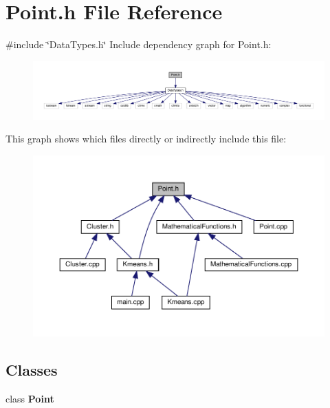 \section{Point.\+h File Reference}
\label{_point_8h}
{\ttfamily \#include \char`\"{}Data\+Types.\+h\char`\"{}}\newline
Include dependency graph for Point.\+h\+:\nopagebreak
\begin{figure}[H]
\begin{center}
\leavevmode
\includegraphics[width=350pt]{_point_8h__incl}
\end{center}
\end{figure}
This graph shows which files directly or indirectly include this file\+:\nopagebreak
\begin{figure}[H]
\begin{center}
\leavevmode
\includegraphics[width=350pt]{_point_8h__dep__incl}
\end{center}
\end{figure}
\subsection*{Classes}
\begin{DoxyCompactItemize}
\item 
class \textbf{ Point}
\end{DoxyCompactItemize}
